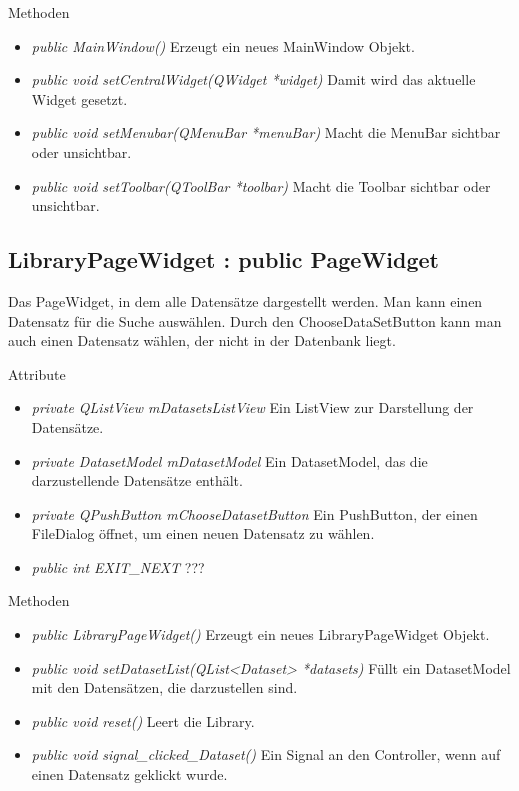 Methoden
\begin{itemize}
	\item\textit{public MainWindow()} 
	Erzeugt ein neues MainWindow Objekt.
	\item\textit{public void setCentralWidget(QWidget *widget)} 
	Damit wird das aktuelle Widget gesetzt.
	\item\textit{public void setMenubar(QMenuBar *menuBar)} 
	Macht die MenuBar sichtbar oder unsichtbar.
	\item\textit{public void setToolbar(QToolBar *toolbar)} 
	Macht die Toolbar sichtbar oder unsichtbar.
\end{itemize}

\subsection*{LibraryPageWidget : public PageWidget}
Das PageWidget, in dem alle Datensätze dargestellt werden. Man kann einen Datensatz für die Suche auswählen. Durch den ChooseDataSetButton kann man auch einen Datensatz wählen, der nicht in der Datenbank liegt. 

Attribute
\begin{itemize}
	\item\textit{private QListView mDatasetsListView} 
	Ein ListView zur Darstellung der Datensätze.
	\item\textit{private DatasetModel mDatasetModel}
	Ein DatasetModel, das die darzustellende Datensätze enthält.
	\item\textit{private QPushButton mChooseDatasetButton} 
	Ein PushButton, der einen FileDialog öffnet, um einen neuen Datensatz zu wählen.
	\item\textit{public int EXIT\_NEXT}
	???     
\end{itemize}

Methoden
\begin{itemize}
	\item\textit{public LibraryPageWidget()} 
	Erzeugt ein neues LibraryPageWidget Objekt.
	\item\textit{public void setDatasetList(QList<Dataset> *datasets)} 
	Füllt ein DatasetModel mit den Datensätzen, die darzustellen sind.
	\item\textit{public void reset()} 
	Leert die Library.
	\item\textit{public void signal\_clicked\_Dataset()} 
	Ein Signal an den Controller, wenn auf einen Datensatz geklickt wurde.
\end{itemize}

